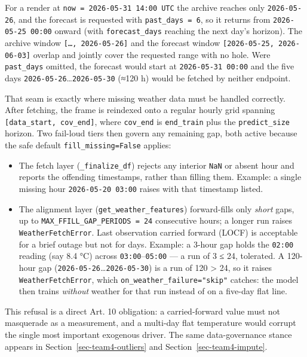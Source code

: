 \documentclass[
  english,
  letterpaper,
]{scrbook}
\providecommand{\tightlist}{%
  \setlength{\itemsep}{0pt}\setlength{\parskip}{0pt}}
\begin{document}
For a render at \texttt{now\ =\ 2026-05-31\ 14:00\ UTC} the archive
reaches only \texttt{2026-05-26}, and the forecast is requested with
\texttt{past\_days\ =\ 6}, so it returns from \texttt{2026-05-25\ 00:00}
onward (with \texttt{forecast\_days} reaching the next day's horizon).
The archive window \texttt{{[}…,\ 2026-05-26{]}} and the forecast window
\texttt{{[}2026-05-25,\ 2026-06-03{]}} overlap and jointly cover the
requested range with no hole. Were \texttt{past\_days} omitted, the
forecast would start at \texttt{2026-05-31\ 00:00} and the five days
\texttt{2026-05-26}\ldots{}\texttt{2026-05-30} (≈120 h) would be fetched
by neither endpoint.

That seam is exactly where missing weather data must be handled
correctly. After fetching, the frame is reindexed onto a regular hourly
grid spanning \texttt{{[}data\_start,\ cov\_end{]}}, where
\texttt{cov\_end} is \texttt{end\_train} plus the \texttt{predict\_size}
horizon. Two fail-loud tiers then govern any remaining gap, both active
because the safe default \texttt{fill\_missing=False} applies:

\begin{itemize}
\tightlist
\item
  The fetch layer (\texttt{\_finalize\_df}) rejects any interior
  \texttt{NaN} or absent hour and reports the offending timestamps,
  rather than filling them. Example: a single missing hour
  \texttt{2026-05-20\ 03:00} raises with that timestamp listed.
\item
  The alignment layer (\texttt{get\_weather\_features}) forward-fills
  only \emph{short} gaps, up to \texttt{MAX\_FFILL\_GAP\_PERIODS\ =\ 24}
  consecutive hours; a longer run raises \texttt{WeatherFetchError}.
  Last observation carried forward (LOCF) is acceptable for a brief
  outage but not for days. Example: a 3-hour gap holds the
  \texttt{02:00} reading (say 8.4 °C) across
  \texttt{03:00}--\texttt{05:00} --- a run of 3 ≤ 24, tolerated. A
  120-hour gap (\texttt{2026-05-26}\ldots{}\texttt{2026-05-30}) is a run
  of 120 \textgreater{} 24, so it raises \texttt{WeatherFetchError},
  which \texttt{on\_weather\_failure="skip"} catches: the model then
  trains \emph{without} weather for that run instead of on a five-day
  flat line.
\end{itemize}

This refusal is a direct Art. 10 obligation: a carried-forward value
must not masquerade as a measurement, and a multi-day flat temperature
would corrupt the single most important exogenous driver. The same
data-governance stance appears in Section~\ref{sec-team4-outliers} and
Section~\ref{sec-team4-impute}.
\end{document}
